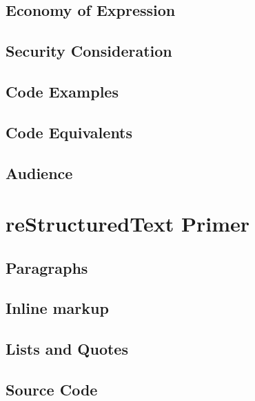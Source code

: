 \documentclass[]{book}
\begin{document}
\hypertarget{economy-of-expression}{%
\subsection{Economy of Expression}\label{economy-of-expression}}

\hypertarget{security-consideration}{%
\subsection{Security Consideration}\label{security-consideration}}

\hypertarget{code-examples}{%
\subsection{Code Examples}\label{code-examples}}

\hypertarget{code-equivalents}{%
\subsection{Code Equivalents}\label{code-equivalents}}

\hypertarget{audience}{%
\subsection{Audience}\label{audience}}

\hypertarget{restructuredtext-primer}{%
\section{reStructuredText Primer}\label{restructuredtext-primer}}

\hypertarget{paragraphs}{%
\subsection{Paragraphs}\label{paragraphs}}

\hypertarget{inline-markup}{%
\subsection{Inline markup}\label{inline-markup}}

\hypertarget{lists-and-quotes}{%
\subsection{Lists and Quotes}\label{lists-and-quotes}}

\hypertarget{source-code}{%
\subsection{Source Code}\label{source-code}}
\end{document}
